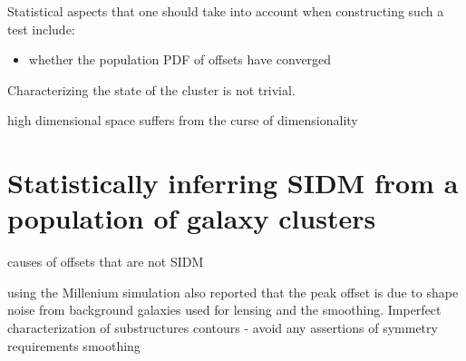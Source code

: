 % 
% 
% 
% 
% 
% 
% 
% 
% 
% 
% 
% 
% 

 
% 
Statistical aspects that one should take into account when constructing such a
test include: 
\begin{itemize}
\item whether the population PDF of offsets have converged  
\end{itemize}
 
Characterizing the state of the cluster is not trivial.

high dimensional space suffers from the curse of dimensionality 


% 

\section{Statistically inferring SIDM from a population of galaxy clusters} 

causes of offsets that are not SIDM 

using the Millenium simulation \cite{Dietrich2012} also reported that 
 the peak offset is due to shape noise from 
background galaxies used for lensing and the smoothing.  
Imperfect characterization of substructures 
contours - avoid any assertions of symmetry requirements  
smoothing 

